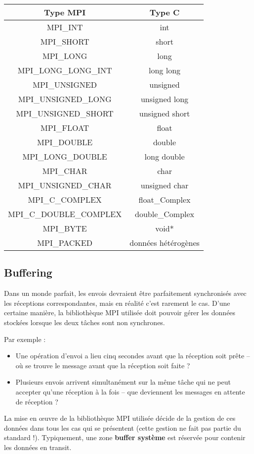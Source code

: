 \documentclass[11pt,a4paper]{article}
\begin{document}
\begin{center}
\begin{tabular}{|c|c|}\hline
Type MPI & Type C \\ \hline
MPI\_INT & int \\
MPI\_SHORT & short \\
MPI\_LONG & long \\
MPI\_LONG\_LONG\_INT & long long \\
MPI\_UNSIGNED & unsigned \\
MPI\_UNSIGNED\_LONG & unsigned long \\
MPI\_UNSIGNED\_SHORT & unsigned short \\
MPI\_FLOAT & float \\
MPI\_DOUBLE & double \\
MPI\_LONG\_DOUBLE & long double \\
MPI\_CHAR & char \\
MPI\_UNSIGNED\_CHAR & unsigned char \\
MPI\_C\_COMPLEX & float\_Complex \\
MPI\_C\_DOUBLE\_COMPLEX & double\_Complex \\
MPI\_BYTE & void* \\
MPI\_PACKED & données hétérogènes\\ \hline
\end{tabular}
\end{center}

\subsection{Buffering}

Dans un monde parfait, les envois devraient être parfaitement synchronisés avec les réceptions correspondantes, mais 
en réalité c'est rarement le cas. D'une certaine manière, la bibliothèque MPI utilisée doit pouvoir gérer les données stockées lorsque les deux tâches sont non synchrones. 

Par exemple :
\begin{itemize}
\item Une opération d'envoi a lieu cinq secondes avant que la réception soit prête -- où se trouve le message avant que la
réception soit faite ?
\item Plusieurs envois arrivent simultanément sur la même tâche qui ne peut accepter qu'une réception à la fois -- que deviennent
les messages en attente de réception ?
\end{itemize}

La mise en {\oe}uvre de la bibliothèque MPI utilisée décide de la gestion de ces données dans tous les cas qui se présentent
(cette gestion ne fait pas partie du standard !). Typiquement, une zone  \textbf{buffer système} est réservée pour contenir les données
en transit. 
\end{document}
